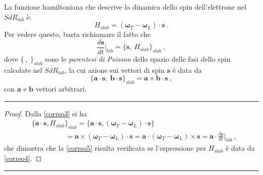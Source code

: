 \documentclass[12pt,a4paper]{report}
\numberwithin{equation}{section}
\numberwithin{section}{chapter}
\begin{document}
	La funzione hamiltoniana che descrive la dinamica dello spin dell'elettrone nel $SdR_{lab}$ \`e:
	\begin{equation}
	\label{corrso4}
	H_{slab} = (\boldsymbol{\omega}_T-\boldsymbol{\omega}_L) \cdot \boldsymbol{s}~.
	\end{equation}
	Per vedere questo, basta richiamare il fatto che
	\begin{equation}
	\label{corrso5}
	\frac{d\boldsymbol{s}}{dt}\bigg\vert_{lab} = \lbrace\boldsymbol{s},~H_{slab}\rbrace_{slab}~,
	\end{equation}
	dove $\lbrace~,~\rbrace_{slab}$ sono le \textit{parentesi di Poisson} dello spazio delle fasi dello spin calcolate nel $SdR_{lab}$, la cui azione sui vettori di spin $\boldsymbol{s}$ \`e data da
	\begin{equation}
	\label{corrso6}
	\lbrace\boldsymbol{a}\cdot\boldsymbol{s},~\boldsymbol{b}\cdot\boldsymbol{s}\rbrace_{slab} = \boldsymbol{a}\times\boldsymbol{b}\cdot\boldsymbol{s}~,
	\end{equation}
	con $\boldsymbol{a}$ e $\boldsymbol{b}$ vettori arbitrari.\par
	\noindent\rule[0.1cm]{15.8cm}{0.1mm}
	\begin{proof}
	Dalla \eqref{corrso3} si ha
	\begin{align}
	\label{corrso7}
	&\lbrace\boldsymbol{a}\cdot\boldsymbol{s},H_{slab}\rbrace_{slab} = \lbrace\boldsymbol{a}\cdot\boldsymbol{s}, (\boldsymbol{\omega}_T - \boldsymbol{\omega}_L) \cdot \boldsymbol{s}\rbrace\\
	&\hspace{2cm}=\boldsymbol{a}\times(\boldsymbol{\omega}_T - \boldsymbol{\omega}_L) \cdot \boldsymbol{s} = \boldsymbol{a} \cdot (\boldsymbol{\omega}_T - \boldsymbol{\omega}_L) \times \boldsymbol{s} = \boldsymbol{a} \cdot \frac{d\boldsymbol{s}}{dt}\bigg\vert_{lab}~,\nonumber
	\end{align}
	che dimostra che la \eqref{corrso5} risulta verificata se l'espressione per $H_{slab}$ \`e data da \eqref{corrso4}.
	\end{proof}
	\noindent\rule[0.1cm]{15.8cm}{0.1mm}
\end{document}
